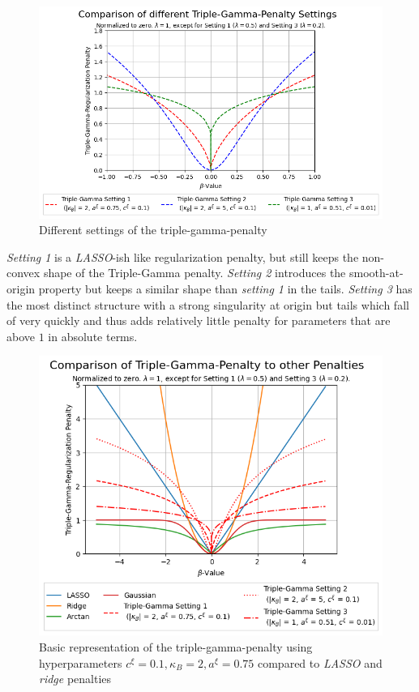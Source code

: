 \documentclass[12pt,a4paper]{article}
\begin{document}
\begin{figure}[H]
\centering
\includegraphics[scale=0.75]{../02_simulation/021_simulation_figures/TGPenalty_DifferentSettings.png}
\caption{Different settings of the triple-gamma-penalty}
\label{fig:DifferentTGPSettings}
\end{figure}

\textit{Setting 1} is a \textit{LASSO}-ish like regularization penalty, but still keeps the non-convex shape of the Triple-Gamma penalty. \textit{Setting 2} introduces the smooth-at-origin property but keeps a similar shape than \textit{setting 1} in the tails. \textit{Setting 3} has the most distinct structure with a strong singularity at origin but tails which fall of very quickly and thus adds relatively little penalty for parameters that are above $1$ in absolute terms.\\

\begin{figure}[h!]
\centering
\includegraphics[scale=0.75]{../02_simulation/021_simulation_figures/TGPenalty_Comparison.png}
\caption{Basic representation of the triple-gamma-penalty using hyperparameters $c^\xi = 0.1, \kappa_B = 2, a^\xi = 0.75$ compared to \textit{LASSO} and \textit{ridge} penalties}
\label{fig:DifferentPenalties}
\end{figure}
\end{document}
